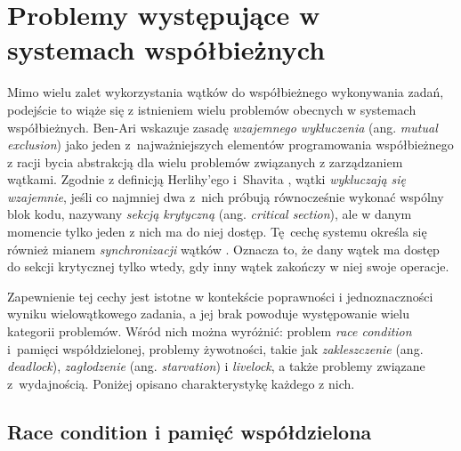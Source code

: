\section{Problemy występujące w systemach współbieżnych}
\label{sec:concurrency-problems}



Mimo wielu zalet wykorzystania wątków do współbieżnego wykonywania zadań, podejście to wiąże się z istnieniem wielu problemów obecnych w systemach współbieżnych.
Ben-Ari \cite{benari1982} wskazuje zasadę \emph{wzajemnego wykluczenia} (ang. \emph{mutual exclusion}) jako jeden z~najważniejszych elementów programowania współbieżnego
z racji bycia abstrakcją dla wielu problemów związanych z zarządzaniem wątkami.
Zgodnie z definicją Herlihy'ego i~Shavita \cite{herlihy2012}, wątki \emph{wykluczają się wzajemnie}, jeśli co najmniej dwa z~nich próbują równocześnie wykonać wspólny blok kodu, nazywany \emph{sekcją krytyczną} (ang. \emph{critical section}), ale w danym momencie tylko jeden z nich ma do niej dostęp. Tę~cechę systemu określa się również mianem \emph{synchronizacji} wątków \cite{gramoli2015}. Oznacza to, że dany wątek ma dostęp do sekcji krytycznej tylko wtedy, gdy inny wątek zakończy w niej swoje operacje.

Zapewnienie tej cechy jest istotne w kontekście poprawności i jednoznaczności wyniku wielowątkowego zadania, a jej brak powoduje występowanie wielu kategorii problemów.
Wśród nich można wyróżnić: problem \emph{race condition} i~pamięci współdzielonej, problemy żywotności, takie jak \emph{zakleszczenie} (ang. \emph{deadlock}), \emph{zagłodzenie} (ang. \emph{starvation}) i \emph{livelock}, a także problemy związane z~wydajnością. Poniżej opisano charakterystykę każdego z nich.

\subsection{Race condition i pamięć współdzielona}

